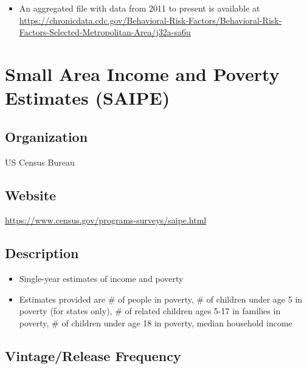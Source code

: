 \documentclass[
]{book}
\providecommand{\tightlist}{%
  \setlength{\itemsep}{0pt}\setlength{\parskip}{0pt}}
\begin{document}
\begin{itemize}
\tightlist
\item
  An aggregated file with data from 2011 to present is available at \url{https://chronicdata.cdc.gov/Behavioral-Risk-Factors/Behavioral-Risk-Factors-Selected-Metropolitan-Area/j32a-sa6u}
\end{itemize}

\mainmatter

\hypertarget{small-area-income-and-poverty-estimates-saipe}{%
\chapter{Small Area Income and Poverty Estimates (SAIPE)}\label{small-area-income-and-poverty-estimates-saipe}}

\hypertarget{organization-78}{%
\section{Organization}\label{organization-78}}

US Census Bureau

\hypertarget{website-78}{%
\section{Website}\label{website-78}}

\url{https://www.census.gov/programs-surveys/saipe.html}

\hypertarget{description-78}{%
\section{Description}\label{description-78}}

\begin{itemize}
\tightlist
\item
  Single-year estimates of income and poverty
\item
  Estimates provided are \# of people in poverty, \# of children under age 5 in poverty (for states only), \# of related children ages 5-17 in families in poverty, \# of children under age 18 in poverty, median household income
\end{itemize}

\hypertarget{vintagerelease-frequency-78}{%
\section{Vintage/Release Frequency}\label{vintagerelease-frequency-78}}
\end{document}
